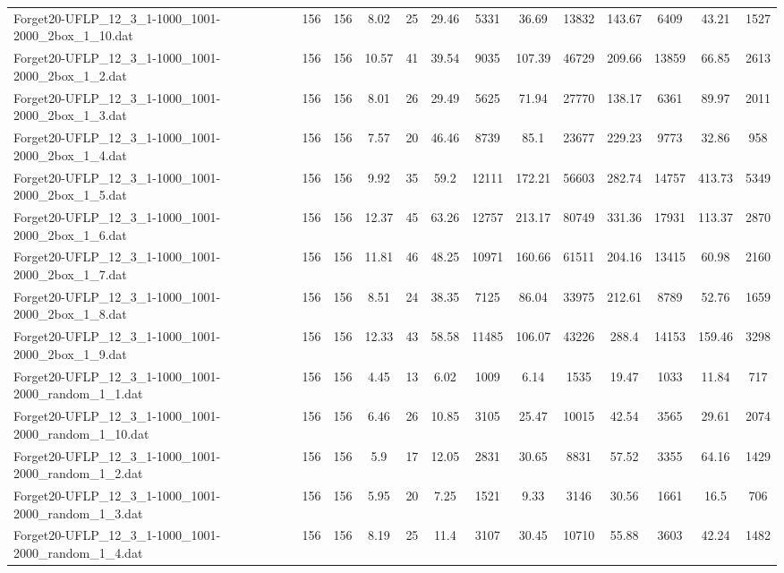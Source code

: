 \begin{table}[!ht]
{\begin{tabular}{lcccccccccccc}
Forget20-UFLP\_12\_3\_1-1000\_1001-2000\_2box\_1\_10.dat & 156 & 156 & 8.02 & 25 & 29.46 & 5331 & 36.69 & 13832 & 143.67 & 6409 & 43.21 & 1527 \\
Forget20-UFLP\_12\_3\_1-1000\_1001-2000\_2box\_1\_2.dat & 156 & 156 & 10.57 & 41 & 39.54 & 9035 & 107.39 & 46729 & 209.66 & 13859 & 66.85 & 2613 \\
Forget20-UFLP\_12\_3\_1-1000\_1001-2000\_2box\_1\_3.dat & 156 & 156 & 8.01 & 26 & 29.49 & 5625 & 71.94 & 27770 & 138.17 & 6361 & 89.97 & 2011 \\
Forget20-UFLP\_12\_3\_1-1000\_1001-2000\_2box\_1\_4.dat & 156 & 156 & 7.57 & 20 & 46.46 & 8739 & 85.1 & 23677 & 229.23 & 9773 & 32.86 & 958 \\
Forget20-UFLP\_12\_3\_1-1000\_1001-2000\_2box\_1\_5.dat & 156 & 156 & 9.92 & 35 & 59.2 & 12111 & 172.21 & 56603 & 282.74 & 14757 & 413.73 & 5349 \\
Forget20-UFLP\_12\_3\_1-1000\_1001-2000\_2box\_1\_6.dat & 156 & 156 & 12.37 & 45 & 63.26 & 12757 & 213.17 & 80749 & 331.36 & 17931 & 113.37 & 2870 \\
Forget20-UFLP\_12\_3\_1-1000\_1001-2000\_2box\_1\_7.dat & 156 & 156 & 11.81 & 46 & 48.25 & 10971 & 160.66 & 61511 & 204.16 & 13415 & 60.98 & 2160 \\
Forget20-UFLP\_12\_3\_1-1000\_1001-2000\_2box\_1\_8.dat & 156 & 156 & 8.51 & 24 & 38.35 & 7125 & 86.04 & 33975 & 212.61 & 8789 & 52.76 & 1659 \\
Forget20-UFLP\_12\_3\_1-1000\_1001-2000\_2box\_1\_9.dat & 156 & 156 & 12.33 & 43 & 58.58 & 11485 & 106.07 & 43226 & 288.4 & 14153 & 159.46 & 3298 \\
Forget20-UFLP\_12\_3\_1-1000\_1001-2000\_random\_1\_1.dat & 156 & 156 & 4.45 & 13 & 6.02 & 1009 & 6.14 & 1535 & 19.47 & 1033 & 11.84 & 717 \\
Forget20-UFLP\_12\_3\_1-1000\_1001-2000\_random\_1\_10.dat & 156 & 156 & 6.46 & 26 & 10.85 & 3105 & 25.47 & 10015 & 42.54 & 3565 & 29.61 & 2074 \\
Forget20-UFLP\_12\_3\_1-1000\_1001-2000\_random\_1\_2.dat & 156 & 156 & 5.9 & 17 & 12.05 & 2831 & 30.65 & 8831 & 57.52 & 3355 & 64.16 & 1429 \\
Forget20-UFLP\_12\_3\_1-1000\_1001-2000\_random\_1\_3.dat & 156 & 156 & 5.95 & 20 & 7.25 & 1521 & 9.33 & 3146 & 30.56 & 1661 & 16.5 & 706 \\
Forget20-UFLP\_12\_3\_1-1000\_1001-2000\_random\_1\_4.dat & 156 & 156 & 8.19 & 25 & 11.4 & 3107 & 30.45 & 10710 & 55.88 & 3603 & 42.24 & 1482 \\

\end{tabular}}
\end{table}
